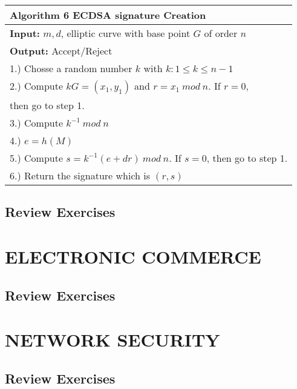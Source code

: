 \documentclass[a4paper, 10 pt, conference]{ieeeconf}
\begin{document}
\begin{table}[h!]
  \begin{center}
    \begin{tabularx}{\columnwidth}{ l   }
    \toprule
    \textbf{Algorithm 6} ECDSA signature Creation \\ \midrule
    \textbf{Input:} $m,d$, elliptic curve with base point $G$ of order $n$ \\ 
    \textbf{Output:} Accept/Reject \\
    1.) Chosse a random number $k$ with $k: 1 \leq k \leq n-1$\\
    2.) Compute $kG = (x_1,y_1)$ and $r = x_1 \ mod \ n$. If $r=0$,\\ then go to step 1. \\
    3.) Compute $k^{-1} \ mod \ n$ \\
    4.) $e = h(M)$ \\
    5.) Compute $s = k^{-1}(e+dr) \ mod \ n$. If $s=0$, then go to step 1. \\
    6.) Return the signature which is $(r,s)$ \\
    \bottomrule
    \end{tabularx}
  \end{center}
\end{table}








\subsection{\textbf{Review Exercises}}






\section{\textbf{ELECTRONIC COMMERCE}}
\subsection{\textbf{Review Exercises}}






\section{\textbf{NETWORK SECURITY}}
\subsection{\textbf{Review Exercises}}
\end{document}
